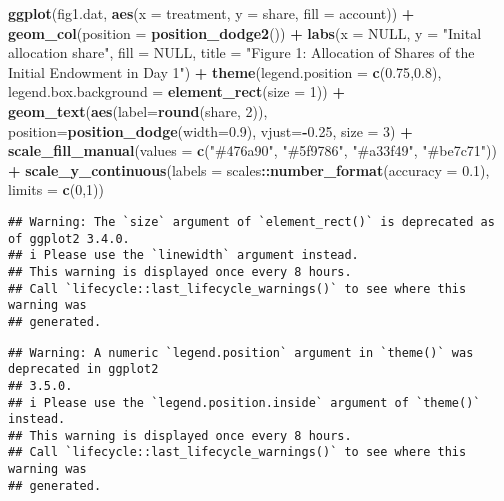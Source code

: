 \documentclass[
]{article}
\newenvironment{Shaded}{\begin{snugshade}}{\end{snugshade}}
\newcommand{\AttributeTok}[1]{\textcolor[rgb]{0.13,0.29,0.53}{#1}}
\newcommand{\ConstantTok}[1]{\textcolor[rgb]{0.56,0.35,0.01}{#1}}
\newcommand{\DecValTok}[1]{\textcolor[rgb]{0.00,0.00,0.81}{#1}}
\newcommand{\FloatTok}[1]{\textcolor[rgb]{0.00,0.00,0.81}{#1}}
\newcommand{\FunctionTok}[1]{\textcolor[rgb]{0.13,0.29,0.53}{\textbf{#1}}}
\newcommand{\NormalTok}[1]{#1}
\newcommand{\SpecialCharTok}[1]{\textcolor[rgb]{0.81,0.36,0.00}{\textbf{#1}}}
\newcommand{\StringTok}[1]{\textcolor[rgb]{0.31,0.60,0.02}{#1}}
\begin{document}
\begin{Shaded}
\begin{Highlighting}[]
\FunctionTok{ggplot}\NormalTok{(fig1.dat, }\FunctionTok{aes}\NormalTok{(}\AttributeTok{x =}\NormalTok{ treatment, }\AttributeTok{y =}\NormalTok{ share, }\AttributeTok{fill =}\NormalTok{ account)) }\SpecialCharTok{+}
  \FunctionTok{geom\_col}\NormalTok{(}\AttributeTok{position =} \FunctionTok{position\_dodge2}\NormalTok{()) }\SpecialCharTok{+}
  \FunctionTok{labs}\NormalTok{(}\AttributeTok{x =} \ConstantTok{NULL}\NormalTok{, }\AttributeTok{y =} \StringTok{"Inital allocation share"}\NormalTok{, }\AttributeTok{fill =} \ConstantTok{NULL}\NormalTok{, }\AttributeTok{title =} \StringTok{"Figure 1: Allocation of Shares of the Initial Endowment in Day 1"}\NormalTok{) }\SpecialCharTok{+}
  \FunctionTok{theme}\NormalTok{(}\AttributeTok{legend.position =} \FunctionTok{c}\NormalTok{(}\FloatTok{0.75}\NormalTok{,}\FloatTok{0.8}\NormalTok{), }\AttributeTok{legend.box.background =} \FunctionTok{element\_rect}\NormalTok{(}\AttributeTok{size =} \DecValTok{1}\NormalTok{)) }\SpecialCharTok{+}
  \FunctionTok{geom\_text}\NormalTok{(}\FunctionTok{aes}\NormalTok{(}\AttributeTok{label=}\FunctionTok{round}\NormalTok{(share, }\DecValTok{2}\NormalTok{)), }\AttributeTok{position=}\FunctionTok{position\_dodge}\NormalTok{(}\AttributeTok{width=}\FloatTok{0.9}\NormalTok{), }\AttributeTok{vjust=}\SpecialCharTok{{-}}\FloatTok{0.25}\NormalTok{, }\AttributeTok{size =} \DecValTok{3}\NormalTok{) }\SpecialCharTok{+}
  \FunctionTok{scale\_fill\_manual}\NormalTok{(}\AttributeTok{values =} \FunctionTok{c}\NormalTok{(}\StringTok{"\#476a90"}\NormalTok{, }\StringTok{"\#5f9786"}\NormalTok{, }\StringTok{"\#a33f49"}\NormalTok{, }\StringTok{"\#be7c71"}\NormalTok{)) }\SpecialCharTok{+}
  \FunctionTok{scale\_y\_continuous}\NormalTok{(}\AttributeTok{labels =}\NormalTok{ scales}\SpecialCharTok{::}\FunctionTok{number\_format}\NormalTok{(}\AttributeTok{accuracy =} \FloatTok{0.1}\NormalTok{), }\AttributeTok{limits =} \FunctionTok{c}\NormalTok{(}\DecValTok{0}\NormalTok{,}\DecValTok{1}\NormalTok{))}
\end{Highlighting}
\end{Shaded}

\begin{verbatim}
## Warning: The `size` argument of `element_rect()` is deprecated as of ggplot2 3.4.0.
## i Please use the `linewidth` argument instead.
## This warning is displayed once every 8 hours.
## Call `lifecycle::last_lifecycle_warnings()` to see where this warning was
## generated.
\end{verbatim}

\begin{verbatim}
## Warning: A numeric `legend.position` argument in `theme()` was deprecated in ggplot2
## 3.5.0.
## i Please use the `legend.position.inside` argument of `theme()` instead.
## This warning is displayed once every 8 hours.
## Call `lifecycle::last_lifecycle_warnings()` to see where this warning was
## generated.
\end{verbatim}
\end{document}
